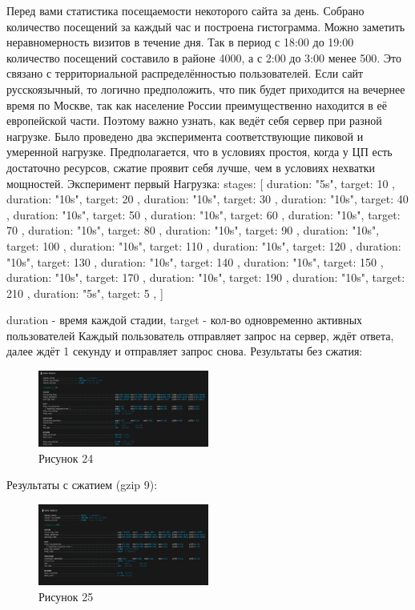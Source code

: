 \documentclass[12pt]{article}
\begin{document}
Перед вами статистика посещаемости некоторого сайта за день. Собрано количество посещений за каждый час и построена гистограмма.
Можно заметить неравномерность визитов в течение дня. Так в период с 18:00 до 19:00 количество посещений составило в районе 4000, а с 2:00 до 3:00 менее 500. Это связано с территориальной распределённостью пользователей. Если сайт русскоязычный, то логично предположить, что пик будет приходится на вечернее время по Москве, так как население России преимущественно находится в её европейской части. Поэтому важно узнать, как ведёт себя сервер при разной нагрузке. 
Было проведено два эксперимента соответствующие пиковой и умеренной нагрузке. Предполагается, что в условиях простоя, когда у ЦП есть достаточно ресурсов, сжатие проявит себя лучше, чем в условиях нехватки мощностей.
Эксперимент первый
Нагрузка:
  stages: [
    { duration: "5s", target: 10 },
    { duration: "10s", target: 20 },
    { duration: "10s", target: 30 },
    { duration: "10s", target: 40 },
    { duration: "10s", target: 50 },
    { duration: "10s", target: 60 },
    { duration: "10s", target: 70 },
    { duration: "10s", target: 80 },
    { duration: "10s", target: 90 },
    { duration: "10s", target: 100 },
    { duration: "10s", target: 110 },
    { duration: "10s", target: 120 },
    { duration: "10s", target: 130 },
    { duration: "10s", target: 140 },
    { duration: "10s", target: 150 },
    { duration: "10s", target: 170 },
    { duration: "10s", target: 190 },
    { duration: "10s", target: 210 },
    { duration: "5s", target: 5 },
  ]

duration - время каждой стадии, target - кол-во одновременно активных пользователей
Каждый пользователь отправляет запрос на сервер, ждёт ответа, далее ждёт 1 секунду и отправляет запрос снова.
Результаты без сжатия:
\begin{figure}[h!]
\centering
\includegraphics[width=0.5\textwidth]{../images/no-compress_exp1_k6screen.png}
\caption{Рисунок 24}
\end{figure}

Результаты с сжатием (gzip 9):
\begin{figure}[h!]
\centering
\includegraphics[width=0.5\textwidth]{../images/gzip9_exp1_k6screen.png}
\caption{Рисунок 25}
\end{figure}
\end{document}
